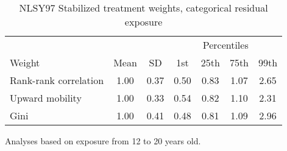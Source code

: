 \begin{table}[htp]
\centering
\footnotesize
\setlength{\tabcolsep}{10pt}
\renewcommand{\arraystretch}{1}
\begin{threeparttable}
\centering
\caption{NLSY97 Stabilized treatment weights, categorical residual exposure} 
\label{tab:ipt_weigths_qr}
\begin{tabular}{lcccccc}
  \hline
\multicolumn{3}{c}{} & \multicolumn{4}{c}{Percentiles} \\ 
 \cmidrule{4-7} 
Weight & Mean & SD & 1st & 25th & 75th & 99th \\ 
  \hline
Rank-rank correlation & 1.00 & 0.37 & 0.50 & 0.83 & 1.07 & 2.65 \\ 
  Upward mobility & 1.00 & 0.33 & 0.54 & 0.82 & 1.10 & 2.31 \\ 
  Gini & 1.00 & 0.41 & 0.48 & 0.81 & 1.09 & 2.96 \\ 
   \hline
\end{tabular}
\begin{tablenotes}
\footnotesize
\item Analyses based on exposure from 12 to 20 years old. 
\end{tablenotes}
\end{threeparttable}
\end{table}
